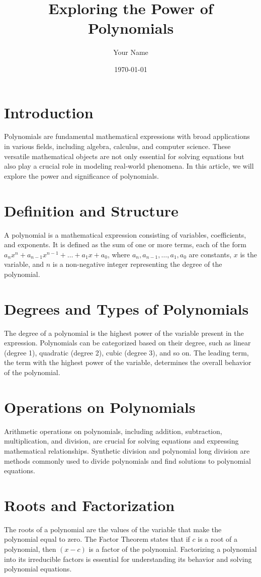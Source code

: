 \documentclass{article}
\title{Exploring the Power of Polynomials}
\author{Your Name}
\date{\today}
\begin{document}
\maketitle

\section*{Introduction}
Polynomials are fundamental mathematical expressions with broad applications in various fields, including algebra, calculus, and computer science. These versatile mathematical objects are not only essential for solving equations but also play a crucial role in modeling real-world phenomena. In this article, we will explore the power and significance of polynomials.

\section*{Definition and Structure}
A polynomial is a mathematical expression consisting of variables, coefficients, and exponents. It is defined as the sum of one or more terms, each of the form $a_nx^n + a_{n-1}x^{n-1} + \ldots + a_1x + a_0$, where $a_n, a_{n-1}, \ldots, a_1, a_0$ are constants, $x$ is the variable, and $n$ is a non-negative integer representing the degree of the polynomial.

\section*{Degrees and Types of Polynomials}
The degree of a polynomial is the highest power of the variable present in the expression. Polynomials can be categorized based on their degree, such as linear (degree 1), quadratic (degree 2), cubic (degree 3), and so on. The leading term, the term with the highest power of the variable, determines the overall behavior of the polynomial.

\section*{Operations on Polynomials}
Arithmetic operations on polynomials, including addition, subtraction, multiplication, and division, are crucial for solving equations and expressing mathematical relationships. Synthetic division and polynomial long division are methods commonly used to divide polynomials and find solutions to polynomial equations.

\section*{Roots and Factorization}
The roots of a polynomial are the values of the variable that make the polynomial equal to zero. The Factor Theorem states that if $c$ is a root of a polynomial, then $(x - c)$ is a factor of the polynomial. Factorizing a polynomial into its irreducible factors is essential for understanding its behavior and solving polynomial equations.
\end{document}
